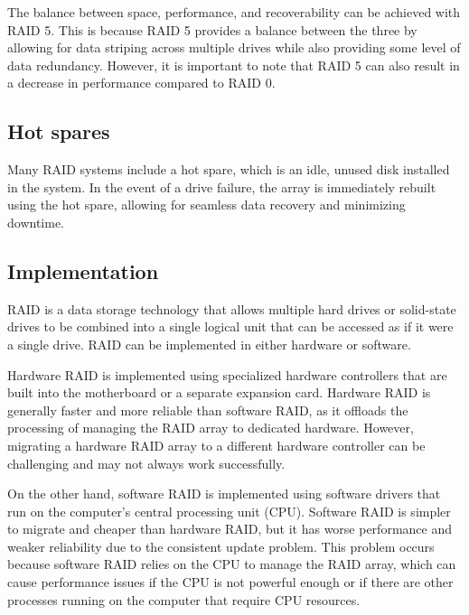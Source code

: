 The balance between space, performance, and recoverability can be achieved with RAID 5. 
This is because RAID 5 provides a balance between the three by allowing for data striping across multiple drives while also providing some level of data redundancy. 
However, it is important to note that RAID 5 can also result in a decrease in performance compared to RAID 0.

\subsection{Hot spares}
Many RAID systems include a hot spare, which is an idle, unused disk installed in the system.
In the event of a drive failure, the array is immediately rebuilt using the hot spare, allowing for seamless data recovery and minimizing downtime.

\subsection{Implementation}
RAID is a data storage technology that allows multiple hard drives or solid-state drives to be combined into a single logical unit that can be accessed as if it were a single drive. 
RAID can be implemented in either hardware or software.

Hardware RAID is implemented using specialized hardware controllers that are built into the motherboard or a separate expansion card. 
Hardware RAID is generally faster and more reliable than software RAID, as it offloads the processing of managing the RAID array to dedicated hardware. 
However, migrating a hardware RAID array to a different hardware controller can be challenging and may not always work successfully.

On the other hand, software RAID is implemented using software drivers that run on the computer's central processing unit (CPU). 
Software RAID is simpler to migrate and cheaper than hardware RAID, but it has worse performance and weaker reliability due to the consistent update problem. 
This problem occurs because software RAID relies on the CPU to manage the RAID array, which can cause performance issues if the CPU is not powerful enough or if there are other processes running on the computer that require CPU resources.